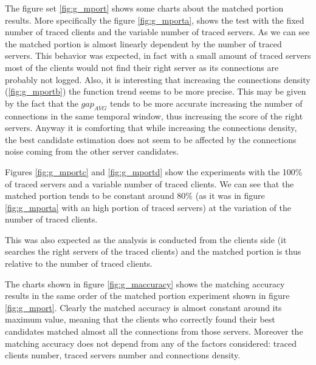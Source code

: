 The figure set \ref{fig:g_mport} shows some charts about the matched
portion results. More specifically the figure \ref{fig:g_mporta}, shows
the test with the fixed number of traced clients and the variable number
of traced servers. As we can see the matched portion is almost linearly 
dependent by the number of traced servers.
This behavior was expected, in fact with a small amount of traced
servers most of the clients would not find their right server as its
connections are probably not logged. Also, it is interesting that
increasing the connections density (\ref{fig:g_mportb}) the function
trend seems to be more precise. This may be given by the fact that the
$gap_{AVG}$ tends to be more accurate increasing the number of
connections in the same temporal window, thus increasing the score of
the right
servers. Anyway it is comforting that while increasing the
connections density, the best candidate estimation does not seem to be affected by the 
 connections noise coming from the other server candidates.

Figures \ref{fig:g_mportc} and \ref{fig:g_mportd} show the experiments
with the 100\% of traced servers and a variable number of
traced clients. We can see
that the matched portion tends to be constant around 80\% (as it was in
figure \ref{fig:g_mporta} with an high portion of traced servers) at the variation of
the number of traced clients. 

This was also expected as the analysis is
conducted from the clients side (it searches the right servers of the                           %
traced clients) and the matched portion is thus relative to the                                 %
number of traced clients. 

The charts shown in figure \ref{fig:g_maccuracy} shows the matching
accuracy results in the same order of the matched portion experiment
shown in figure \ref{fig:g_mport}. Clearly the matched accuracy is
almost constant around its maximum value, meaning that the clients who
correctly found their best candidates matched almost all the connections
from those servers. Moreover the matching accuracy does not
depend from any of the factors considered: traced clients number, traced
servers number and connections density.



